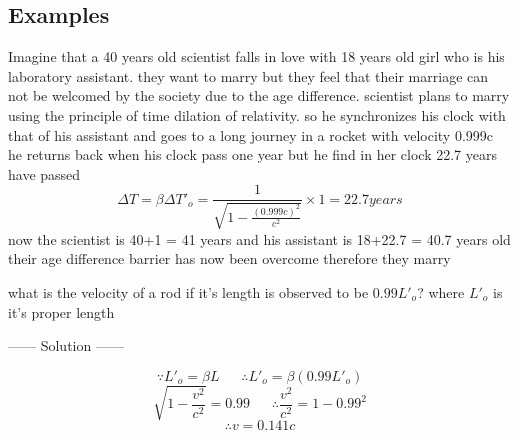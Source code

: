 \documentclass{article}
\begin{document}
\subsection{Examples}
\begin{example}
    Imagine that a 40 years old scientist falls in love with 18 years old girl who is his laboratory assistant.
    they want to marry but they feel that their marriage can not be welcomed by the society due to the age difference.
    scientist plans to marry using the principle of time dilation of relativity. so he synchronizes his clock with that of his assistant and goes to a long journey in a rocket with velocity 0.999c\\
    he returns back when his clock pass one year but he find in her clock 22.7 years have passed 
    \[
    \Delta T = \beta\Delta T'_o = \frac{1}{\sqrt{1-\frac{{(0.999c)}^2}{c^2}}} \times 1 = 22.7\si{years}
    \]
    now the scientist is 40+1 = 41 years and his assistant is 18+22.7 = 40.7 years old their age difference barrier has now been overcome therefore they marry    
\end{example}
\begin{example}
    what is the velocity of a rod if it's length is observed to be $0.99L'_o$? where $L'_o$ is it's proper length
\begin{center}
    ------ \textcolor{Solution}{Solution} ------ 
\end{center}
\[
\because L'_o = \beta L \ \ \ \ \ \ \ \therefore L'_o = \beta(0.99L'_o)
\]
\[
\sqrt{1-\frac{v^2}{c^2}} = 0.99 \ \ \ \ \ \ \ \therefore \frac{v^2}{c^2} = 1-0.99^2
\]
\[
\therefore v = 0.141c
\]
\end{example}
\end{document}
